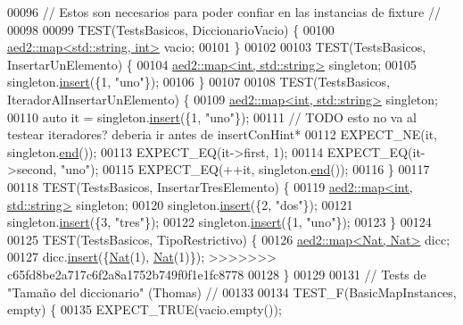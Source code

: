 \begin{DoxyCode}
00096 \textcolor{comment}{// Estos son necesarios para poder confiar en las instancias de fixture //}
00098 \textcolor{comment}{}
00099 TEST(TestsBasicos, DiccionarioVacio) \{
00100     \hyperlink{classaed2_1_1map}{aed2::map<std::string, int>} vacio;
00101 \}
00102 
00103 TEST(TestsBasicos, InsertarUnElemento) \{
00104     \hyperlink{classaed2_1_1map}{aed2::map<int, std::string>} singleton;
00105     singleton.\hyperlink{classaed2_1_1map_a60aacba06b1579630b3c8e996cf248c8_a60aacba06b1579630b3c8e996cf248c8}{insert}(\{1, \textcolor{stringliteral}{"uno"}\});
00106 \}
00107 
00108 TEST(TestsBasicos, IteradorAlInsertarUnElemento) \{
00109     \hyperlink{classaed2_1_1map}{aed2::map<int, std::string>} singleton;
00110     \textcolor{keyword}{auto} it = singleton.\hyperlink{classaed2_1_1map_a60aacba06b1579630b3c8e996cf248c8_a60aacba06b1579630b3c8e996cf248c8}{insert}(\{1, \textcolor{stringliteral}{"uno"}\});
00111     \textcolor{comment}{// TODO esto no va al testear iteradores? deberia ir antes de insertConHint*}
00112     EXPECT\_NE(it, singleton.\hyperlink{classaed2_1_1map_a76023e6a56cb625513e1b5ea028bf983_a76023e6a56cb625513e1b5ea028bf983}{end}());
00113     EXPECT\_EQ(it->first, 1);
00114     EXPECT\_EQ(it->second, \textcolor{stringliteral}{"uno"});
00115     EXPECT\_EQ(++it, singleton.\hyperlink{classaed2_1_1map_a76023e6a56cb625513e1b5ea028bf983_a76023e6a56cb625513e1b5ea028bf983}{end}());
00116 \}
00117 
00118 TEST(TestsBasicos, InsertarTresElemento) \{
00119     \hyperlink{classaed2_1_1map}{aed2::map<int, std::string>} singleton;
00120     singleton.\hyperlink{classaed2_1_1map_a60aacba06b1579630b3c8e996cf248c8_a60aacba06b1579630b3c8e996cf248c8}{insert}(\{2, \textcolor{stringliteral}{"dos"}\});
00121     singleton.\hyperlink{classaed2_1_1map_a60aacba06b1579630b3c8e996cf248c8_a60aacba06b1579630b3c8e996cf248c8}{insert}(\{3, \textcolor{stringliteral}{"tres"}\});
00122     singleton.\hyperlink{classaed2_1_1map_a60aacba06b1579630b3c8e996cf248c8_a60aacba06b1579630b3c8e996cf248c8}{insert}(\{1, \textcolor{stringliteral}{"uno"}\});
00123 \}
00124 
00125 TEST(TestsBasicos, TipoRestrictivo) \{
00126     \hyperlink{classaed2_1_1map}{aed2::map<Nat, Nat>} dicc;
00127     dicc.\hyperlink{classaed2_1_1map_a60aacba06b1579630b3c8e996cf248c8_a60aacba06b1579630b3c8e996cf248c8}{insert}(\{\hyperlink{classNat}{Nat}(1), \hyperlink{classNat}{Nat}(1)\});
>>>>>>> c65fd8be2a717c6f2a8a1752b749f0f1e1fc8778
00128 \}
00129 
00131 \textcolor{comment}{// Tests de "Tamaño del diccionario" (Thomas) //}
00133 \textcolor{comment}{}
00134 TEST\_F(BasicMapInstances, empty) \{
00135     EXPECT\_TRUE(vacio.empty());

\end{DoxyCode}

